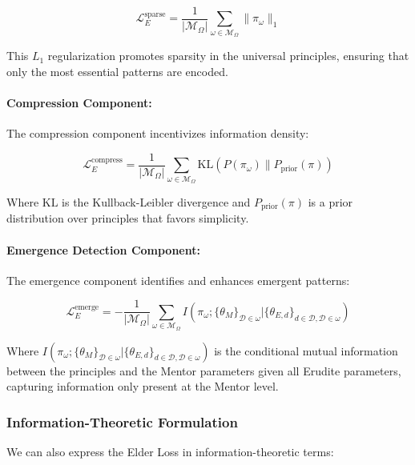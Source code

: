 \begin{equation}
\mathcal{L}_E^{\text{sparse}} = \frac{1}{|\mathcal{M}_{\Omega}|} \sum_{\omega \in \mathcal{M}_{\Omega}} \|\pi_{\omega}\|_1
\end{equation}

This $L_1$ regularization promotes sparsity in the universal principles, ensuring that only the most essential patterns are encoded.

\paragraph{Compression Component:}
The compression component incentivizes information density:

\begin{equation}
\mathcal{L}_E^{\text{compress}} = \frac{1}{|\mathcal{M}_{\Omega}|} \sum_{\omega \in \mathcal{M}_{\Omega}} \text{KL}(P(\pi_{\omega}) \| P_{\text{prior}}(\pi))
\end{equation}

Where $\text{KL}$ is the Kullback-Leibler divergence and $P_{\text{prior}}(\pi)$ is a prior distribution over principles that favors simplicity.

\paragraph{Emergence Detection Component:}
The emergence component identifies and enhances emergent patterns:

\begin{equation}
\mathcal{L}_E^{\text{emerge}} = -\frac{1}{|\mathcal{M}_{\Omega}|} \sum_{\omega \in \mathcal{M}_{\Omega}} I(\pi_{\omega}; \{\theta_{M}\}_{\mathcal{D} \in \omega} | \{\theta_{E,d}\}_{d \in \mathcal{D}, \mathcal{D} \in \omega})
\end{equation}

Where $I(\pi_{\omega}; \{\theta_{M}\}_{\mathcal{D} \in \omega} | \{\theta_{E,d}\}_{d \in \mathcal{D}, \mathcal{D} \in \omega})$ is the conditional mutual information between the principles and the Mentor parameters given all Erudite parameters, capturing information only present at the Mentor level.

\subsubsection{Information-Theoretic Formulation}

We can also express the Elder Loss in information-theoretic terms:

